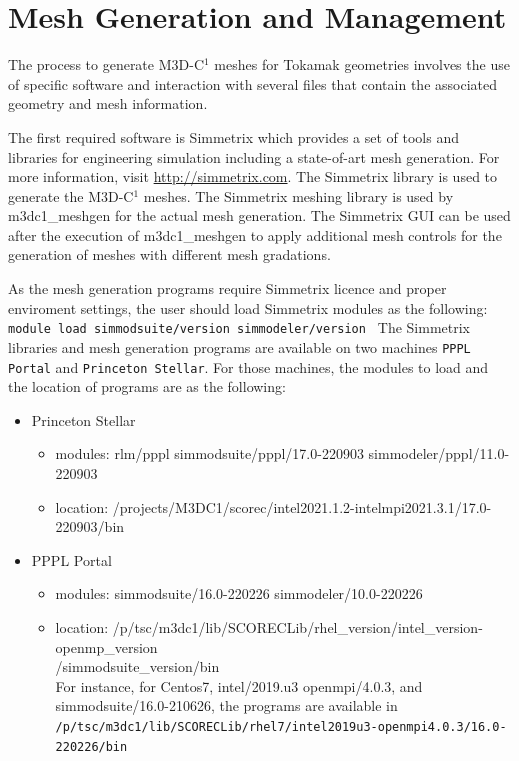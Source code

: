 \section{Mesh Generation and Management}

The process to generate M3D-C$^{1}$ meshes for Tokamak geometries involves the use of specific software and interaction with several files that contain the associated geometry and mesh information.

The first required software is Simmetrix which provides a set of tools and libraries for engineering simulation including a state-of-art mesh generation. For more information, visit \href{http://simmetrix.com}{http://simmetrix.com}. The Simmetrix library is used to generate the M3D-C$^{1}$ meshes. The Simmetrix meshing library is used by m3dc1\_meshgen for the actual mesh generation. The Simmetrix GUI can be used after the execution of m3dc1\_meshgen to apply additional mesh controls for the generation of meshes with different mesh gradations. 

As the mesh generation programs require Simmetrix licence and proper enviroment settings, the user should load Simmetrix modules as the following:
\newline\newline
\texttt{
module load simmodsuite/version simmodeler/version
}
\newline\newline
The Simmetrix libraries and mesh generation programs are available on two machines \texttt{PPPL Portal} and \texttt{Princeton Stellar}. For those machines, the modules to load and the location of programs are as the following:

\begin{itemize}
\item {Princeton Stellar}
  \begin{itemize}
  \item modules: rlm/pppl simmodsuite/pppl/17.0-220903 simmodeler/pppl/11.0-220903
  \item location: /projects/M3DC1/scorec/intel2021.1.2-intelmpi2021.3.1/17.0-220903/bin
  \end{itemize}
\item {PPPL Portal}
  \begin{itemize}
  \item modules: simmodsuite/16.0-220226 simmodeler/10.0-220226
  \item location: {/p/tsc/m3dc1/lib/SCORECLib/rhel\_version/intel\_version-openmp\_version \\
	    /simmodsuite\_version/bin} \\
  \newline\newline
  For instance, for Centos7, intel/2019.u3 openmpi/4.0.3, and simmodsuite/16.0-210626, the programs are available in
  \newline\newline
  \texttt{/p/tsc/m3dc1/lib/SCORECLib/rhel7/intel2019u3-openmpi4.0.3/16.0-220226/bin}
  \end{itemize}
\end{itemize}

